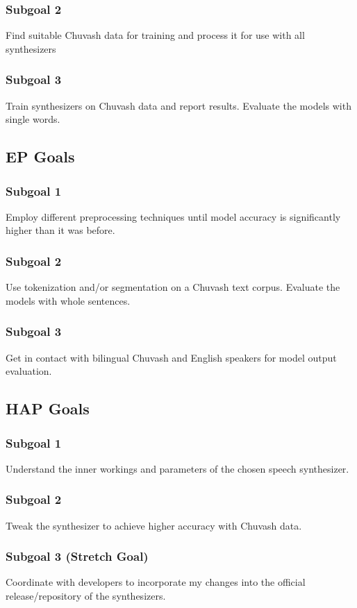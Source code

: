 \documentclass[fleqn,10pt]{SelfArx} %
\begin{document}
	\subsubsection{Subgoal 2}
	Find suitable Chuvash data for training and process it for use with all synthesizers
	\subsubsection{Subgoal 3}
	Train synthesizers on Chuvash data and report results. Evaluate the models with single words.
	
	\subsection{EP Goals}
	\subsubsection{Subgoal 1}
	Employ different preprocessing techniques until model accuracy is significantly higher than it was before.
	\subsubsection{Subgoal 2}
	Use tokenization and/or segmentation on a Chuvash text corpus. Evaluate the models with whole sentences.
	\subsubsection{Subgoal 3}
	Get in contact with bilingual Chuvash and English speakers for model output evaluation.
	
	\subsection{HAP Goals}
	\subsubsection{Subgoal 1}
	Understand the inner workings and parameters of the chosen speech synthesizer.
	\subsubsection{Subgoal 2}
	Tweak the synthesizer to achieve higher accuracy with Chuvash data.
	\subsubsection{Subgoal 3 (Stretch Goal)}
	Coordinate with developers to incorporate my changes into the official release/repository of the synthesizers.
	
\end{document}
